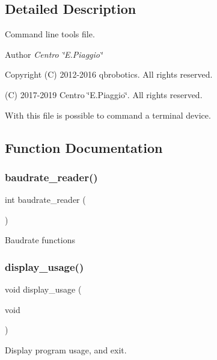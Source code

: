 \subsection{Detailed Description}
Command line tools file. 

\begin{DoxyAuthor}{Author}
{\itshape Centro \char`\"{}\+E.\+Piaggio\char`\"{}} 
\end{DoxyAuthor}
\begin{DoxyCopyright}{Copyright}
(C) 2012-\/2016 qbrobotics. All rights reserved. 

(C) 2017-\/2019 Centro \char`\"{}\+E.\+Piaggio\char`\"{}. All rights reserved.
\end{DoxyCopyright}
With this file is possible to command a terminal device. 

\subsection{Function Documentation}
\mbox{\label{qbadmin_8c_a872d84bb02f7d8f4617246f0c6d37c43}} 
\subsubsection{baudrate\+\_\+reader()}
{\footnotesize\ttfamily int baudrate\+\_\+reader (\begin{DoxyParamCaption}{ }\end{DoxyParamCaption})}

Baudrate functions \mbox{\label{qbadmin_8c_acf5088e61b616f77674f62a9ba3b86b7}} 
\subsubsection{display\+\_\+usage()}
{\footnotesize\ttfamily void display\+\_\+usage (\begin{DoxyParamCaption}\item[{void}]{ }\end{DoxyParamCaption})}

Display program usage, and exit. \mbox{\label{qbadmin_8c_a98a5d602fbf649e7f9e8f851cb757f71}} 
